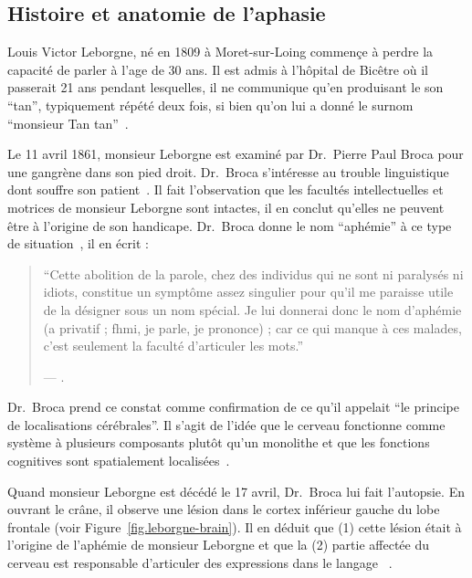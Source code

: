 \subsection{Histoire et anatomie de l'aphasie}

Louis Victor Leborgne, né en 1809 à Moret-sur-Loing commençe à perdre 
la capacité de parler à l'age de 30 ans.
Il est admis à l'hôpital de Bicêtre où il passerait 21 ans pendant lesquelles, 
il ne communique qu'en produisant le son ``tan'', typiquement répété deux fois, 
si bien qu'on lui a donné le surnom ``monsieur Tan tan''~\cite{Mohammed_Narayan_Patra_Nanda_2018}.

Le 11 avril 1861, monsieur Leborgne est examiné par Dr.~Pierre Paul Broca 
pour une gangrène dans son pied droit.
Dr.~Broca s'intéresse au trouble linguistique dont souffre son patient~\cite{Lorch_2011}.
Il fait l'observation que les facultés intellectuelles et motrices de monsieur Leborgne sont intactes,
il en conclut qu'elles ne peuvent être à l'origine de son handicape. 
Dr.~Broca donne le nom ``aphémie'' à ce type de situation~\cite{Broca}, il en écrit :

\begin{quotation}
    ``Cette abolition de la parole, chez des individus qui ne sont ni paralysés ni idiots, constitue un symptôme assez singulier pour qu'il me paraisse utile de la désigner sous un nom spécial. Je lui donnerai donc le nom d'aphémie (\textgreek{a} privatif ; \textgreek{fhmi}, je parle, je prononce) ; car ce qui manque à ces malades, c'est seulement la faculté d'articuler les mots.''
    \begin{flushright}
        \rm --- .
    \end{flushright}
\end{quotation}

Dr.~Broca prend ce constat comme confirmation de ce qu'il appelait 
``le principe de localisations cérébrales''.
Il s'agit de l'idée que le cerveau fonctionne comme système à plusieurs composants plutôt qu'un monolithe
et que les fonctions cognitives sont spatialement localisées~\cite{Fodor_1983}.

Quand monsieur Leborgne est décédé le 17 avril, Dr.~Broca lui fait l'autopsie.
En ouvrant le crâne, il observe une lésion dans le cortex inférieur gauche du lobe frontale 
(voir Figure~\ref{fig.leborgne-brain}).
Il en déduit que (1) cette lésion était à l'origine de l'aphémie de monsieur Leborgne et 
que la (2) partie affectée du cerveau est responsable d'articuler des expressions dans le langage
~\cite{Broca,Lorch_2011,Mohammed_Narayan_Patra_Nanda_2018}.

